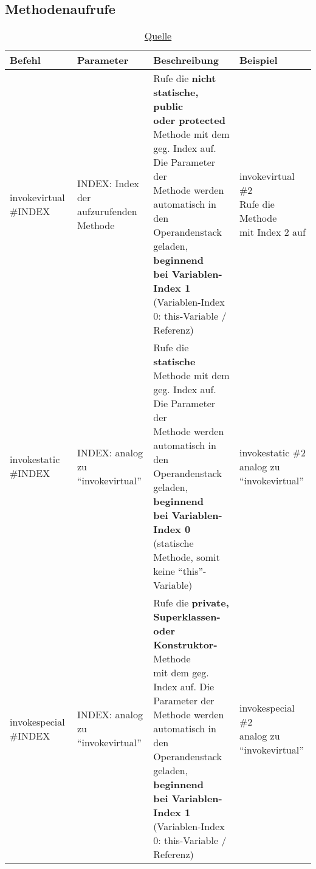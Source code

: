 \subsection{Methodenaufrufe}
\begin{table}[h]
	\centering
	\label{my-label}
	\caption{\href{https://www.javaworld.com/article/2860079/learn-java/dynamic-101.html}{Quelle}}
	\begin{tabular}{l|l|l|l|}
		Befehl & Parameter & Beschreibung & Beispiel \\ \hline
		
		invokevirtual \#INDEX 
		& \multlineTable{INDEX: Index der\\ aufzurufenden Methode} 
		& \multlineTable{Rufe die \textbf{nicht statische, public}\\ \textbf{oder protected} Methode mit dem\\ geg. Index auf. Die Parameter der\\ Methode werden automatisch in den\\ Operandenstack geladen, \textbf{beginnend}\\ \textbf{bei Variablen-Index 1}\\ (Variablen-Index 0: this-Variable / Referenz)} 
		& \multlineTable{invokevirtual \#2\\  Rufe die Methode\\ mit Index 2 auf\\ \slide{73}{419} } \\ \hline
		
		invokestatic \#INDEX 
		& \multlineTable{INDEX:  analog zu\\ \enquote{invokevirtual}} 
		& \multlineTable{Rufe die \textbf{statische} Methode mit dem\\ geg. Index auf. Die Parameter der\\ Methode werden automatisch in den\\ Operandenstack geladen, \textbf{beginnend}\\ \textbf{bei Variablen-Index 0}\\ (statische Methode, somit keine \enquote{this}-Variable)} 
		& \multlineTable{invokestatic \#2\\ analog zu \enquote{invokevirtual}}\\  \hline
		
		invokespecial \#INDEX 
		& \multlineTable{INDEX:  analog zu\\ \enquote{invokevirtual}} 
		& \multlineTable{Rufe die \textbf{private, Superklassen-}\\ \textbf{oder Konstruktor-} Methode\\ mit dem geg. Index auf. Die Parameter der\\ Methode werden automatisch in den\\ Operandenstack geladen, \textbf{beginnend}\\ \textbf{bei Variablen-Index 1}\\ (Variablen-Index 0: this-Variable / Referenz)} 
		& \multlineTable{invokespecial \#2 \\ analog zu \enquote{invokevirtual}} \\ \hline
		

\end{tabular}
\end{table}
